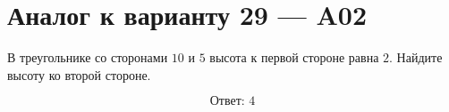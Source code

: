 


\section*{Аналог к варианту 29 — A02}
В треугольнике со сторонами \(10\) и \(5\) высота к первой стороне равна \(2\). Найдите высоту ко второй стороне.
\begin{center}\figTriangleAltitudes\end{center}
\[\boxed{\text{Ответ: }4}\]

